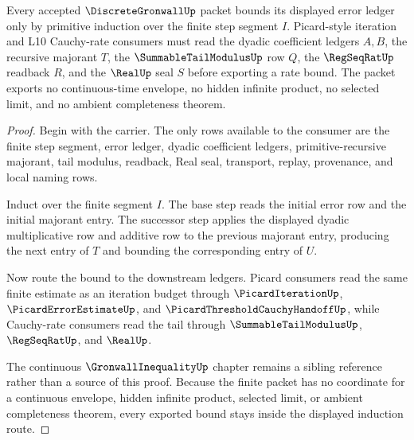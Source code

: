 \begin{theorem}
\label{thm:discrete-gronwall-finite-induction-boundary}
Every accepted $\DiscreteGronwallUp$ packet bounds its displayed error ledger only by primitive induction over the finite step segment $I$. Picard-style iteration and L10 Cauchy-rate consumers must read the dyadic coefficient ledgers $A,B$, the recursive majorant $T$, the $\SummableTailModulusUp$ row $Q$, the $\RegSeqRatUp$ readback $R$, and the $\RealUp$ seal $S$ before exporting a rate bound. The packet exports no continuous-time envelope, no hidden infinite product, no selected limit, and no ambient completeness theorem.
\end{theorem}
\begin{proof}
Begin with the carrier. The only rows available to the consumer are the finite step segment, error ledger, dyadic coefficient ledgers, primitive-recursive majorant, tail modulus, readback, Real seal, transport, replay, provenance, and local naming rows.

Induct over the finite segment $I$. The base step reads the initial error row and the initial majorant entry. The successor step applies the displayed dyadic multiplicative row and additive row to the previous majorant entry, producing the next entry of $T$ and bounding the corresponding entry of $U$.

Now route the bound to the downstream ledgers. Picard consumers read the same finite estimate as an iteration budget through $\PicardIterationUp$, $\PicardErrorEstimateUp$, and $\PicardThresholdCauchyHandoffUp$, while Cauchy-rate consumers read the tail through $\SummableTailModulusUp$, $\RegSeqRatUp$, and $\RealUp$.

The continuous $\GronwallInequalityUp$ chapter remains a sibling reference rather than a source of this proof. Because the finite packet has no coordinate for a continuous envelope, hidden infinite product, selected limit, or ambient completeness theorem, every exported bound stays inside the displayed induction route.
\end{proof}

